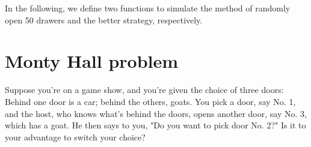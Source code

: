 In the following, we define two functions to simulate the method of randomly
open 50 drawers and the better strategy, respectively.



\hypertarget{Monty-Hall-problem}{%
\section{Monty Hall problem}\label{Monty-Hall-problem}}


Suppose you're on a game show, and you're given the choice of three doors:
Behind one door is a car; behind the others, goats. You pick a door, say No. 1,
and the host, who knows what's behind the doors, opens another door, say No. 3,
which has a goat. He then says to you, "Do you want to pick door No. 2?" Is it
to your advantage to switch your choice?





